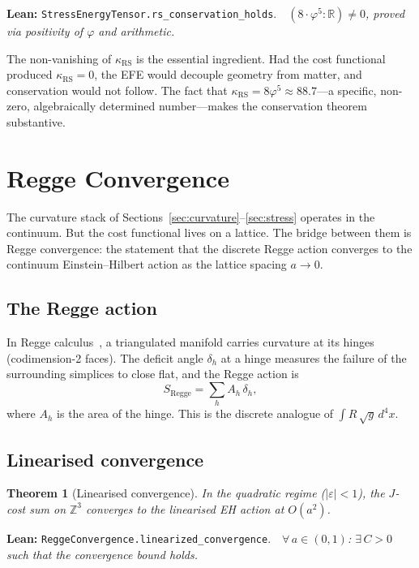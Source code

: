 \documentclass[11pt,a4paper]{article}
\newtheorem{theorem}{Theorem}[section]
\newcommand{\vp}{\varphi}
\newcommand{\kRS}{\kappa_{\mathrm{RS}}}
\newcommand{\Jcost}{J}
\newcommand{\ZZ}{\mathbb{Z}}
\newcommand{\RR}{\mathbb{R}}
\newcommand{\lean}[1]{\texttt{#1}}
\newcommand{\leanref}[2]{\noindent\textbf{Lean:} \lean{#1}.\ \ \textit{#2}}
\begin{document}
\leanref{StressEnergyTensor.rs\_conservation\_holds}{$(8 \cdot \vp^5 : \RR) \ne 0$, proved via positivity of $\vp$ and arithmetic.}

\noindent The non-vanishing of $\kRS$ is the essential ingredient.
Had the cost functional produced $\kRS = 0$, the EFE would decouple geometry from matter, and conservation would not follow.
The fact that $\kRS = 8\vp^5 \approx 88.7$---a specific, non-zero, algebraically determined number---makes the conservation theorem substantive.

\section{Regge Convergence}
\label{sec:regge}

The curvature stack of Sections~\ref{sec:curvature}--\ref{sec:stress} operates in the continuum.
But the cost functional lives on a lattice.
The bridge between them is Regge convergence: the statement that the discrete Regge action converges to the continuum Einstein--Hilbert action as the lattice spacing $a \to 0$.

\subsection{The Regge action}

In Regge calculus~\cite{Regge1961}, a triangulated manifold carries curvature at its hinges (codimension-2 faces).
The deficit angle $\delta_h$ at a hinge measures the failure of the surrounding simplices to close flat, and the Regge action is
\[
S_{\mathrm{Regge}} = \sum_h A_h\,\delta_h,
\]
where $A_h$ is the area of the hinge.
This is the discrete analogue of $\int R\,\sqrt{g}\,d^4x$.

\subsection{Linearised convergence}

\begin{theorem}[Linearised convergence]
\label{thm:lin_conv}
In the quadratic regime ($|\varepsilon| < 1$), the $\Jcost$-cost sum on $\ZZ^3$ converges to the linearised EH action at $O(a^2)$.
\end{theorem}

\leanref{ReggeConvergence.linearized\_convergence}{$\forall\,a \in (0,1)$: $\exists\,C > 0$ such that the convergence bound holds.}
\end{document}
